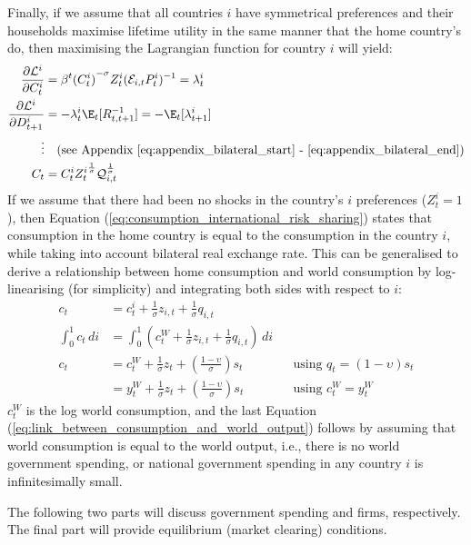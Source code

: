 Finally, if we assume that all countries $i$ have symmetrical preferences and their households maximise lifetime utility in the same manner that the home country's do, then maximising the Lagrangian function for country $i$ will yield:
\begin{align}
 \frac{\partial \mathcal{L}^i}{\partial C_t^i} &= \beta^t {(C^i_t)}^{-\sigma} Z^i_t(\mathcal{E}_{i,t}P^i_{t})^{-1} = \lambda^i_t \nonumber\\
 \frac{\partial \mathcal{L}^i}{\partial D_{t+1}^i} & = -\lambda^i_t \E_t[R^{-1}_{t,t+1}] = -\E_t[\lambda^i_{t+1}] \nonumber\\
 \vdots & \quad \text{(see Appendix \ref{eq:appendix_bilateral_start} - \ref{eq:appendix_bilateral_end})} \\
 C_t &= {C^i_t} {Z^i_t}^{\frac{1}{\sigma}} \mathcal{Q}_{i,t}^{\frac{1}{\sigma}} \label{eq:consumption_international_risk_sharing}
\end{align}
If we assume that there had been no shocks in the country's $i$ preferences ($Z^i_t = 1$), then Equation (\ref{eq:consumption_international_risk_sharing}) states that consumption in the home country is equal to the consumption in the country $i$, while taking into account bilateral real exchange rate. This can be generalised to derive a relationship between home consumption and world consumption by log-linearising (for simplicity) and integrating both sides with respect to $i$:
\begin{align}
 c_t &= c_{t}^i + \frac{1}{\sigma}z_{i,t} + \frac{1}{\sigma}q_{i,t} \\
 \int_{0}^{1} c_t \, di & = \int_{0}^{1} \left( c_t^{W} + \frac{1}{\sigma}z_{i,t} + \frac{1}{\sigma} q_{i,t}\right) \, di \\
 c_t & = c_t^{W} + \frac{1}{\sigma}z_t + \left(\frac{1-\upsilon}{\sigma}\right)s_t \label{eq:link_between_consumption_and_world_consumption} & & \text{using $q_t=(1-\upsilon)s_t$} \\
 & = y_t^{W} + \frac{1}{\sigma}z_t + \left(\frac{1-\upsilon}{\sigma}\right)s_t \label{eq:link_between_consumption_and_world_output} & & \text{using $c^{W}_t=y^{W}_t$} 
\end{align}
$c_t^{W}$ is the log world consumption, and the last Equation (\ref{eq:link_between_consumption_and_world_output}) follows by assuming that world consumption is equal to the world output, i.e., there is no world government spending, or national government spending in any country $i$ is infinitesimally small.

The following two parts will discuss government spending and firms, respectively. The final part will provide equilibrium (market clearing) conditions.